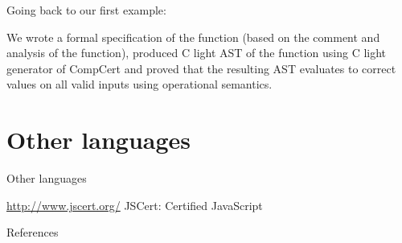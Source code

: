 \documentclass[10pt]{beamer}
\begin{document}
    \begin{frame}
      Going back to our first example:
      
       We wrote a formal specification of the function (based on the comment and analysis of the function), produced C light AST of the function using C light generator of CompCert and proved that the resulting AST evaluates to correct values on all valid inputs using operational semantics. 
      \end{frame}

\section{Other languages}

\begin{frame}{Other languages}

  \url{http://www.jscert.org/} JSCert: Certified JavaScript
  
  \end{frame}

\begin{frame}[allowframebreaks]{References}

  
  

\end{frame}
\end{document}
